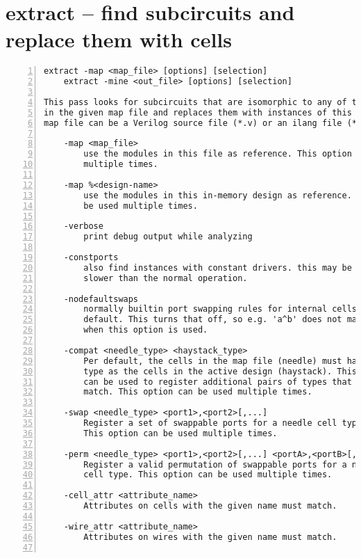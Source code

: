 \section{extract -- find subcircuits and replace them with cells}
\label{cmd:extract}
\begin{lstlisting}[numbers=left,frame=single]
    extract -map <map_file> [options] [selection]
    extract -mine <out_file> [options] [selection]

This pass looks for subcircuits that are isomorphic to any of the modules
in the given map file and replaces them with instances of this modules. The
map file can be a Verilog source file (*.v) or an ilang file (*.il).

    -map <map_file>
        use the modules in this file as reference. This option can be used
        multiple times.

    -map %<design-name>
        use the modules in this in-memory design as reference. This option can
        be used multiple times.

    -verbose
        print debug output while analyzing

    -constports
        also find instances with constant drivers. this may be much
        slower than the normal operation.

    -nodefaultswaps
        normally builtin port swapping rules for internal cells are used per
        default. This turns that off, so e.g. 'a^b' does not match 'b^a'
        when this option is used.

    -compat <needle_type> <haystack_type>
        Per default, the cells in the map file (needle) must have the
        type as the cells in the active design (haystack). This option
        can be used to register additional pairs of types that should
        match. This option can be used multiple times.

    -swap <needle_type> <port1>,<port2>[,...]
        Register a set of swappable ports for a needle cell type.
        This option can be used multiple times.

    -perm <needle_type> <port1>,<port2>[,...] <portA>,<portB>[,...]
        Register a valid permutation of swappable ports for a needle
        cell type. This option can be used multiple times.

    -cell_attr <attribute_name>
        Attributes on cells with the given name must match.

    -wire_attr <attribute_name>
        Attributes on wires with the given name must match.


\end{lstlisting}
